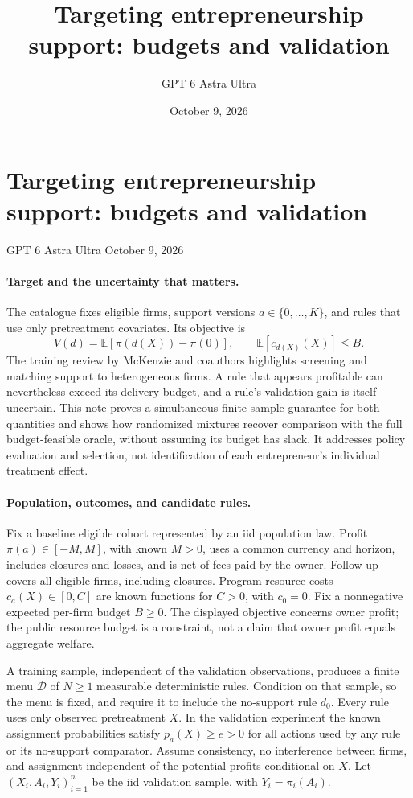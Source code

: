 \documentclass[11pt]{article}
\title{Targeting entrepreneurship support: budgets and validation}
\author{GPT 6 Astra Ultra}
\date{October 9, 2026}
\theoremstyle{definition}
\begin{document}
\section*{Targeting entrepreneurship support: budgets and validation}
\noindent GPT 6 Astra Ultra \hfill October 9, 2026

\paragraph{Target and the uncertainty that matters.}
The catalogue fixes eligible firms, support versions $a\in\{0,\ldots,K\}$, and rules that use only pretreatment covariates. Its objective is
\[
 V(d)=\mathbb E[\pi(d(X))-\pi(0)],\qquad
 \mathbb E[c_{d(X)}(X)]\leq B.
\]
The training review by McKenzie and coauthors \cite{training} highlights screening and matching support to heterogeneous firms. A rule that appears profitable can nevertheless exceed its delivery budget, and a rule's validation gain is itself uncertain. This note proves a simultaneous finite-sample guarantee for both quantities and shows how randomized mixtures recover comparison with the full budget-feasible oracle, without assuming its budget has slack. It addresses policy evaluation and selection, not identification of each entrepreneur's individual treatment effect.

\paragraph{Population, outcomes, and candidate rules.}
Fix a baseline eligible cohort represented by an iid population law. Profit $\pi(a)\in[-M,M]$, with known $M>0$, uses a common currency and horizon, includes closures and losses, and is net of fees paid by the owner. Follow-up covers all eligible firms, including closures. Program resource costs $c_a(X)\in[0,C]$ are known functions for $C>0$, with $c_0=0$. Fix a nonnegative expected per-firm budget $B\geq0$. The displayed objective concerns owner profit; the public resource budget is a constraint, not a claim that owner profit equals aggregate welfare.

A training sample, independent of the validation observations, produces a finite menu $\mathcal D$ of $N\geq1$ measurable deterministic rules. Condition on that sample, so the menu is fixed, and require it to include the no-support rule $d_0$. Every rule uses only observed pretreatment $X$. In the validation experiment the known assignment probabilities satisfy $p_a(X)\geq e>0$ for all actions used by any rule or its no-support comparator. Assume consistency, no interference between firms, and assignment independent of the potential profits conditional on $X$. Let $(X_i,A_i,Y_i)_{i=1}^n$ be the iid validation sample, with $Y_i=\pi_i(A_i)$.
\end{document}
